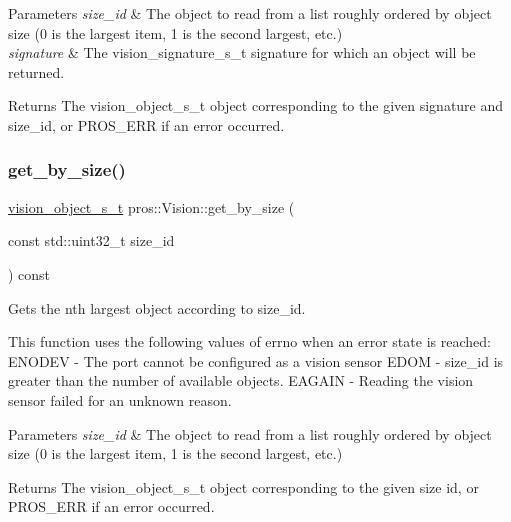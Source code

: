\begin{DoxyParams}{Parameters}
{\em size\+\_\+id} & The object to read from a list roughly ordered by object size (0 is the largest item, 1 is the second largest, etc.) \\
\hline
{\em signature} & The vision\+\_\+signature\+\_\+s\+\_\+t signature for which an object will be returned.\\
\hline
\end{DoxyParams}
\begin{DoxyReturn}{Returns}
The vision\+\_\+object\+\_\+s\+\_\+t object corresponding to the given signature and size\+\_\+id, or P\+R\+O\+S\+\_\+\+E\+RR if an error occurred. 
\end{DoxyReturn}
\mbox{\label{classpros_1_1Vision_aa5cca450a5b80278a97bbea786195733}} 
\subsubsection{\texorpdfstring{get\+\_\+by\+\_\+size()}{get\_by\_size()}}
{\footnotesize\ttfamily \hyperlink{vision_8h_ae619120558539c13e53b5a6f42fb4375}{vision\+\_\+object\+\_\+s\+\_\+t} pros\+::\+Vision\+::get\+\_\+by\+\_\+size (\begin{DoxyParamCaption}\item[{const std\+::uint32\+\_\+t}]{size\+\_\+id }\end{DoxyParamCaption}) const}



Gets the nth largest object according to size\+\_\+id. 

This function uses the following values of errno when an error state is reached\+: E\+N\+O\+D\+EV -\/ The port cannot be configured as a vision sensor E\+D\+OM -\/ size\+\_\+id is greater than the number of available objects. E\+A\+G\+A\+IN -\/ Reading the vision sensor failed for an unknown reason.


\begin{DoxyParams}{Parameters}
{\em size\+\_\+id} & The object to read from a list roughly ordered by object size (0 is the largest item, 1 is the second largest, etc.)\\
\hline
\end{DoxyParams}
\begin{DoxyReturn}{Returns}
The vision\+\_\+object\+\_\+s\+\_\+t object corresponding to the given size id, or P\+R\+O\+S\+\_\+\+E\+RR if an error occurred. 
\end{DoxyReturn}
\mbox{\label{classpros_1_1Vision_a80552b2897b8edcdb68bc56477213f2e}} 
